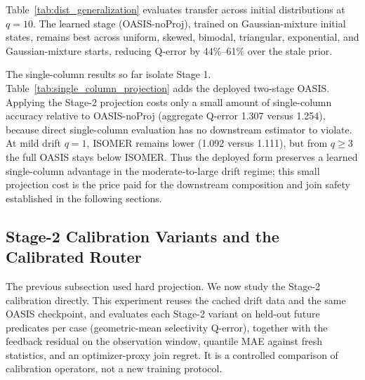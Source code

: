 \documentclass[preprint,12pt]{elsarticle}
\begin{document}
Table~\ref{tab:dist_generalization} evaluates transfer across initial
distributions at $q=10$. The learned stage (OASIS-noProj), trained on
Gaussian-mixture initial states, remains best across uniform, skewed, bimodal,
triangular, exponential, and Gaussian-mixture starts, reducing Q-error by
44\%--61\% over the stale prior.

\begingroup
\let\oasisOriginalCaption\caption
\renewcommand{\small}{\footnotesize}
\renewcommand{\caption}[1]{\oasisOriginalCaption{Single-column selectivity
Q-error ($\downarrow$) of the full two-stage OASIS versus the OASIS-noProj
ablation, on in-distribution compound drift. At mild drift $q=1$, ISOMER is
lowest; from $q\geq3$, the full OASIS stays below ISOMER, so the deployed
(projected) form preserves a learned single-column advantage in the
moderate-to-large drift regime. The projection costs only a small amount relative
to the stage-1 ablation, the price paid for the downstream composition and join
safety shown in Tables~\ref{tab:marginal_joint}, \ref{tab:composition_family}
and \ref{tab:factorjoin}.}}

\endgroup

The single-column results so far isolate Stage 1. Table~\ref{tab:single_column_projection}
adds the deployed two-stage OASIS. Applying the Stage-2 projection costs only a
small amount of single-column accuracy relative to OASIS-noProj (aggregate
Q-error 1.307 versus 1.254), because direct single-column evaluation has no
downstream estimator to violate. At mild drift $q=1$, ISOMER remains lower
(1.092 versus 1.111), but from $q\geq3$ the full OASIS stays below ISOMER. Thus
the deployed form preserves a learned single-column advantage in the
moderate-to-large drift regime; this small projection cost is the price paid for
the downstream composition and join safety established in the following
sections.

\subsection{Stage-2 Calibration Variants and the Calibrated Router}
\label{sec:stage2-calibration}

The previous subsection used hard projection. We now study the Stage-2
calibration directly. This experiment reuses the cached drift data and the same
OASIS checkpoint, and evaluates each Stage-2 variant on held-out future
predicates per case (geometric-mean selectivity Q-error), together with the
feedback residual on the observation window, quantile MAE against fresh
statistics, and an optimizer-proxy join regret. It is a controlled comparison of
calibration operators, not a new training protocol.
\end{document}
